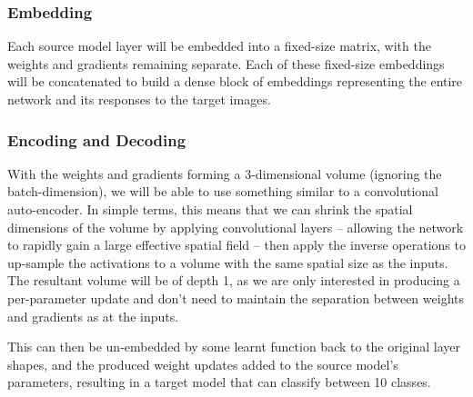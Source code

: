\documentclass{report}
\begin{document}
	\subsubsection{Embedding}
	Each source model layer will be embedded into a fixed-size matrix, with the weights and gradients remaining separate. Each of these fixed-size embeddings will be concatenated to build a dense block of embeddings representing the entire network and its responses to the target images. \par
	
	\subsubsection{Encoding and Decoding}
	With the weights and gradients forming a 3-dimensional volume (ignoring the batch-dimension), we will be able to use something similar to a convolutional auto-encoder. In simple terms, this means that we can shrink the spatial dimensions of the volume by applying convolutional layers -- allowing the network to rapidly gain a large effective spatial field -- then apply the inverse operations to up-sample the activations to a volume with the same spatial size as the inputs. The resultant volume will be of depth 1, as we are only interested in producing a per-parameter update and don't need to maintain the separation between weights and gradients as at the inputs. \par
	This can then be un-embedded by some learnt function back to the original layer shapes, and the produced weight updates added to the source model's parameters, resulting in a target model that can classify between 10 classes.
	
\end{document}

